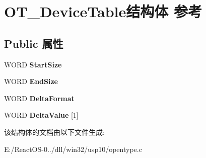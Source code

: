 \hypertarget{struct_o_t___device_table}{}\section{O\+T\+\_\+\+Device\+Table结构体 参考}
\label{struct_o_t___device_table}
\subsection*{Public 属性}
\begin{DoxyCompactItemize}
\item 
\mbox{\label{struct_o_t___device_table_ae20f6647a606f9ad14401d2f9e050703}} 
W\+O\+RD {\bfseries Start\+Size}
\item 
\mbox{\label{struct_o_t___device_table_afce38d6b8e70c03839716da8a4f74ec0}} 
W\+O\+RD {\bfseries End\+Size}
\item 
\mbox{\label{struct_o_t___device_table_ac7736287e9f1f2d3b6ca95b924080cc7}} 
W\+O\+RD {\bfseries Delta\+Format}
\item 
\mbox{\label{struct_o_t___device_table_a20b2cec463a028b23d982635ba8f94d5}} 
W\+O\+RD {\bfseries Delta\+Value} \mbox{[}1\mbox{]}
\end{DoxyCompactItemize}


该结构体的文档由以下文件生成\+:\begin{DoxyCompactItemize}
\item 
E\+:/\+React\+O\+S-\/0../dll/win32/usp10/opentype.\+c\end{DoxyCompactItemize}
